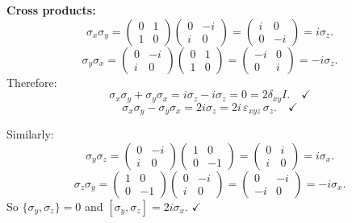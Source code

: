 \documentclass[12pt]{article}
\begin{document}
\medskip
\textbf{Cross products:}
\[
\sigma_x\sigma_y = \begin{pmatrix} 0&1\\1&0 \end{pmatrix}\begin{pmatrix} 0&-i\\i&0 \end{pmatrix} = \begin{pmatrix} i&0\\0&-i \end{pmatrix} = i\sigma_z.
\]
\[
\sigma_y\sigma_x = \begin{pmatrix} 0&-i\\i&0 \end{pmatrix}\begin{pmatrix} 0&1\\1&0 \end{pmatrix} = \begin{pmatrix} -i&0\\0&i \end{pmatrix} = -i\sigma_z.
\]
Therefore:
\[
\sigma_x\sigma_y + \sigma_y\sigma_x = i\sigma_z - i\sigma_z = 0 = 2\delta_{xy}I. \quad \checkmark
\]
\[
\sigma_x\sigma_y - \sigma_y\sigma_x = 2i\sigma_z = 2i\,\varepsilon_{xyz}\,\sigma_z. \quad \checkmark
\]

Similarly:
\[
\sigma_y\sigma_z = \begin{pmatrix} 0&-i\\i&0 \end{pmatrix}\begin{pmatrix} 1&0\\0&-1 \end{pmatrix} = \begin{pmatrix} 0&i\\i&0 \end{pmatrix} = i\sigma_x.
\]
\[
\sigma_z\sigma_y = \begin{pmatrix} 1&0\\0&-1 \end{pmatrix}\begin{pmatrix} 0&-i\\i&0 \end{pmatrix} = \begin{pmatrix} 0&-i\\-i&0 \end{pmatrix} = -i\sigma_x.
\]
So $\{\sigma_y,\sigma_z\} = 0$ and $[\sigma_y,\sigma_z] = 2i\sigma_x$. $\checkmark$
\end{document}
